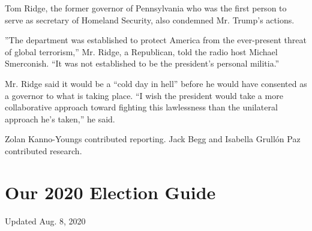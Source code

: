 Tom Ridge, the former governor of Pennsylvania who was the first person
to serve as secretary of Homeland Security, also condemned Mr. Trump's
actions.

''The department was established to protect America from the
ever-present threat of global terrorism,'' Mr. Ridge, a Republican, told
the radio host Michael Smerconish. ``It was not established to be the
president's personal militia.''

Mr. Ridge said it would be a ``cold day in hell'' before he would have
consented as a governor to what is taking place. ``I wish the president
would take a more collaborative approach toward fighting this
lawlessness than the unilateral approach he's taken,'' he said.

Zolan Kanno-Youngs contributed reporting. Jack Begg and Isabella Grullón
Paz contributed research.

\hypertarget{our-2020-election-guide}{%
\section{Our 2020 Election Guide}\label{our-2020-election-guide}}

Updated Aug. 8, 2020

